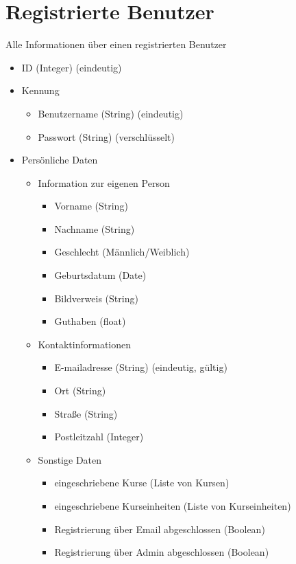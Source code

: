\documentclass[a4paper]{scrreprt}
\begin{document}
\section{Registrierte Benutzer}
\Func {} Alle Informationen über einen registrierten Benutzer
\begin{itemize}
	\item ID (Integer) (eindeutig)
	\item Kennung
	\begin{itemize}
		\item Benutzername (String) (eindeutig)
		\item Passwort (String) (verschlüsselt)
	\end{itemize}
	\item Persönliche Daten
	\begin{itemize}
		\item Information zur eigenen Person	
		\begin{itemize}
			\item Vorname (String)
			\item Nachname (String)
			\item Geschlecht (Männlich/Weiblich)
			\item Geburtsdatum (Date)
			\item Bildverweis (String)
			\item Guthaben (float)
		\end{itemize}
		\item Kontaktinformationen
		\begin{itemize}
			\item E-mailadresse (String) (eindeutig, gültig)
			\item Ort (String)
			\item Straße (String)
			\item Postleitzahl (Integer)
		\end{itemize}
		\item Sonstige Daten
		\begin{itemize}
			\item eingeschriebene Kurse (Liste von Kursen)
			\item eingeschriebene Kurseinheiten (Liste von Kurseinheiten)
			\item Registrierung über Email abgeschlossen (Boolean)
			\item Registrierung über Admin abgeschlossen (Boolean)
		\end{itemize}	
	\end{itemize}
	
\end{itemize}
\end{document}
